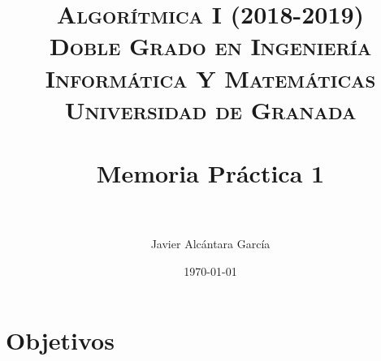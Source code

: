 



\title{	
\normalfont \normalsize 
\textsc{\textbf{Algorítmica I (2018-2019)} \\ Doble Grado en Ingeniería Informática Y Matemáticas \\ Universidad de Granada} \\ [25pt] %
\horrule{0.5pt} \\[0.4cm] %
\huge Memoria Práctica 1 \\ %
\horrule{2pt} \\[0.5cm] %
}

\author{Javier Alcántara García} %

\date{\normalsize\today} %





\maketitle %

\newpage %

\tableofcontents %

\listoffigures

\listoftables

\newpage


\section{Objetivos}

\newpage

